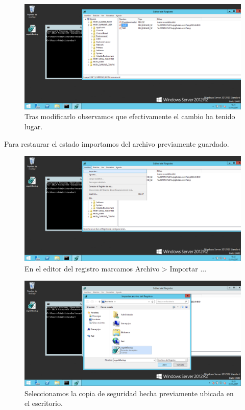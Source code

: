 \begin{figure}[H]
	\centering
	\includegraphics[scale=0.4]{regedit4.png}
	\caption{Tras modificarlo observamos que efectivamente el cambio ha tenido lugar.}
\end{figure}

Para restaurar el estado importamos del archivo previamente guardado.

\begin{figure}[H]
	\centering
	\includegraphics[scale=0.4]{regedit5.png}
	\caption{En el editor del registro marcamos Archivo > Importar ...}
\end{figure}


\begin{figure}[H]
	\centering
	\includegraphics[scale=0.4]{regedit6.png}
	\caption{Seleccionamos la copia de seguridad hecha previamente ubicada en el escritorio.}
\end{figure}

